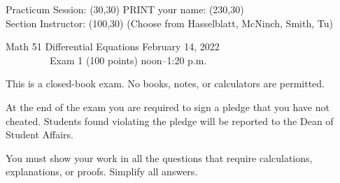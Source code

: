 \documentclass[12pt]{article}
\begin{document}
\noindent
Practicum Session: \framebox(30,30){} \quad PRINT your name:  \framebox(230,30){}\\

\smallskip
\noindent
Section Instructor: \framebox(100,30){} (Choose from Hasselblatt, McNinch, Smith, Tu)


\begin{center}
Math 51 \hfill Differential Equations \hfill February 14, 2022\\
\hfill ~~~~~~~~~Exam 1 (100 points) \hfill noon--1:20 p.m.
\end{center}

\medskip

This is a closed-book exam.  No books, notes, or calculators are permitted.

At the end of the exam you are required to sign a pledge that you have not
cheated.  
Students found violating the pledge will be reported to the Dean of Student Affairs.

You must show your work in all the questions that require
calculations, explanations, 
or proofs.  Simplify all answers.



\end{document}

